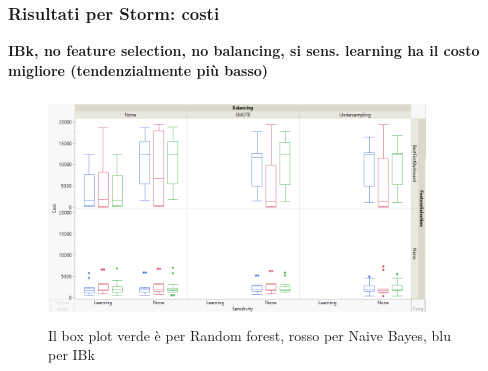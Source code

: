 \documentclass{beamer}
\begin{document}
\begin{frame}
	\frametitle{Risultati per Storm: costi}
	
	\fontsize{7pt}{8pt}\selectfont
	
	\textbf{IBk, no feature selection, no balancing, si sens. learning ha il costo migliore 
	(tendenzialmente più basso)}
	
	\centering
	\begin{figure}
	\includegraphics[width=10cm, height=6cm]{storm-cost}
	\caption{Il box plot verde è per Random forest, rosso per Naive Bayes, blu per IBk}
	\end{figure}
\end{frame}
\end{document}
